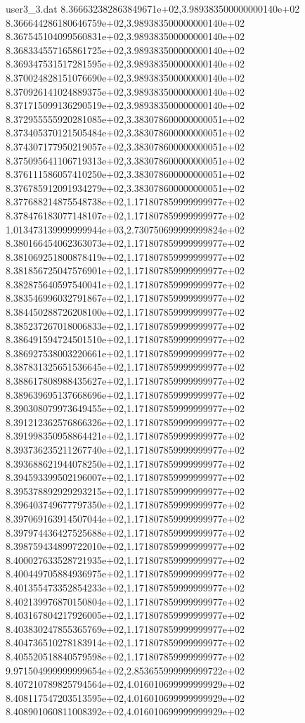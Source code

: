 \begin{filecontents}{user3_3.dat}
8.366632382863849671e+02,3.989383500000000140e+02
8.366644286180646759e+02,3.989383500000000140e+02
8.367545104099560831e+02,3.989383500000000140e+02
8.368334557165861725e+02,3.989383500000000140e+02
8.369347531517281595e+02,3.989383500000000140e+02
8.370024828151076690e+02,3.989383500000000140e+02
8.370926141024889375e+02,3.989383500000000140e+02
8.371715099136290519e+02,3.989383500000000140e+02
8.372955555920281085e+02,3.383078600000000051e+02
8.373405370121505484e+02,3.383078600000000051e+02
8.374307177950219057e+02,3.383078600000000051e+02
8.375095641106719313e+02,3.383078600000000051e+02
8.376111586057410250e+02,3.383078600000000051e+02
8.376785912091934279e+02,3.383078600000000051e+02
8.377688214875548738e+02,1.171807859999999977e+02
8.378476183077148107e+02,1.171807859999999977e+02
1.013473139999999944e+03,2.730750699999999824e+02
8.380166454062363073e+02,1.171807859999999977e+02
8.381069251800878419e+02,1.171807859999999977e+02
8.381856725047576901e+02,1.171807859999999977e+02
8.382875640597540041e+02,1.171807859999999977e+02
8.383546996032791867e+02,1.171807859999999977e+02
8.384450288726208100e+02,1.171807859999999977e+02
8.385237267018006833e+02,1.171807859999999977e+02
8.386491594724501510e+02,1.171807859999999977e+02
8.386927538003220661e+02,1.171807859999999977e+02
8.387831325651536645e+02,1.171807859999999977e+02
8.388617808988435627e+02,1.171807859999999977e+02
8.389639695137668696e+02,1.171807859999999977e+02
8.390308079973649455e+02,1.171807859999999977e+02
8.391212362576866326e+02,1.171807859999999977e+02
8.391998350958864421e+02,1.171807859999999977e+02
8.393736235211267740e+02,1.171807859999999977e+02
8.393688621944078250e+02,1.171807859999999977e+02
8.394593399502196007e+02,1.171807859999999977e+02
8.395378892929293215e+02,1.171807859999999977e+02
8.396403749677797350e+02,1.171807859999999977e+02
8.397069163914507044e+02,1.171807859999999977e+02
8.397974436427525688e+02,1.171807859999999977e+02
8.398759434899722010e+02,1.171807859999999977e+02
8.400027633528721935e+02,1.171807859999999977e+02
8.400449705884936975e+02,1.171807859999999977e+02
8.401355473352854233e+02,1.171807859999999977e+02
8.402139976870150804e+02,1.171807859999999977e+02
8.403167804217926005e+02,1.171807859999999977e+02
8.403830247855365769e+02,1.171807859999999977e+02
8.404736510278183914e+02,1.171807859999999977e+02
8.405520518840579598e+02,1.171807859999999977e+02
9.971504999999999654e+02,2.853655999999999722e+02
8.407210789825794564e+02,4.016010699999999929e+02
8.408117547203513595e+02,4.016010699999999929e+02
8.408901060811008392e+02,4.016010699999999929e+02

\end{filecontents}

